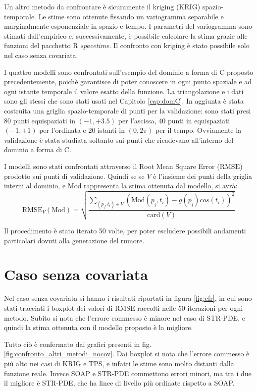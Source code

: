 \documentclass[a4paper,11pt,twoside,openright]{book}							%
\begin{document}
Un altro metodo da confrontare è sicuramente il kriging (KRIG) spazio-temporale. Le stime sono ottenute fissando un variogramma separabile e marginalmente esponenziale in spazio e tempo. I parametri del variogramma sono stimati dall'empirico e, successivamente, è possibile calcolare la stima grazie alle funzioni del pacchetto R \textit{spacetime}. Il confronto con kriging è stato possibile solo nel caso senza covariata.

I quattro modelli sono confrontati sull'esempio del dominio a forma di C proposto precedentemente, poichè garantisce di poter conoscere in ogni punto spaziale e ad ogni istante temporale il valore esatto della funzione. La triangolazione e i dati sono gli stessi che sono stati usati nel Capitolo \ref{cap:domC}. In aggiunta è stata costruita una griglia spazio-temporale di punti per la validazione: sono stati presi 80 punti equispaziati in $(-1,+3.5)$ per l'ascissa, 40 punti in equispaziati $(-1,+1)$ per l'ordinata e 20 istanti in $(0,2\pi)$ per il tempo. Ovviamente la validazione è stata studiata soltanto sui punti che ricadevano all'interno del dominio a forma di C.

I modelli sono stati confrontati attraverso il Root Mean Square Error ($\mathrm{RMSE}$) prodotto sui punti di validazione. Quindi se se $V$ è l'insieme dei punti della griglia interni al dominio, e $\mathrm{Mod}$ rappresenta la stima ottenuta dal modello, si avrà:
$$
\mathrm{RMSE}_V(\mathrm{Mod})=\sqrt{\frac{\sum_{(\underline p_i,t_i)\in V} (\mathrm{Mod}(\underline p_i,t_i)-g(\underline p_i)cos(t_i))^2}{\mathrm{card}(V)}}
$$ 

Il procedimento è stato iterato 50 volte, per poter escludere possibili andamenti particolari dovuti alla generazione del rumore.

\newpage
\section{Caso senza covariata}
Nel caso senza covariata si hanno i risultati riportati in figura \ref{fig:cfr}, in cui sono stati tracciati i boxplot dei valori di $\mathrm{RMSE}$ raccolti nelle 50 iterazioni per ogni metodo. Subito si nota che l'errore commesso è minore nel caso di STR-PDE, e quindi la stima ottenuta con il modello proposto è la migliore.

Tutto ciò è confermato dai grafici presenti in fig. \ref{fig:confronto_altri_metodi_nocov}. Dai boxplot si nota che l'errore commesso è più alto nei casi di KRIG e TPS, e infatti le stime sono molto distanti dalla funzione reale. Invece SOAP e STR-PDE commettono errori minori, ma tra i due il migliore è STR-PDE, che ha linee di livello più ordinate rispetto a SOAP. 
\end{document}
